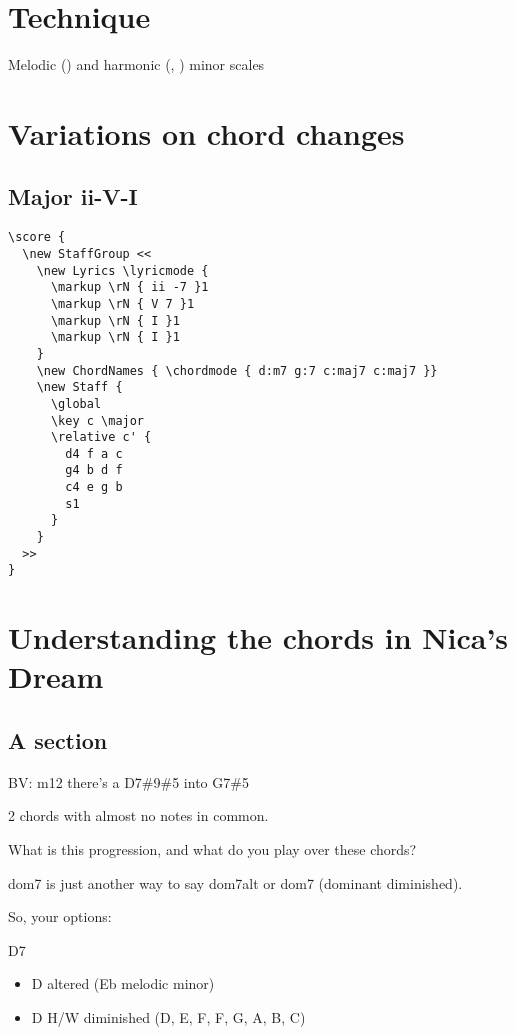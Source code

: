 \documentclass[11pt]{article}
\begin{document}
\section{Technique}
\label{sec:org7b39137}
Melodic () and harmonic (, ) minor scales
\section{Variations on chord changes}
\label{sec:orgda233fb}

\subsection{Major ii-V-I}
\label{sec:orgcec6f3b}
\begin{verbatim}
\score {
  \new StaffGroup <<
    \new Lyrics \lyricmode {
      \markup \rN { ii -7 }1
      \markup \rN { V 7 }1
      \markup \rN { I }1
      \markup \rN { I }1
    }
    \new ChordNames { \chordmode { d:m7 g:7 c:maj7 c:maj7 }}
    \new Staff {
      \global
      \key c \major
      \relative c' {
        d4 f a c
        g4 b d f
        c4 e g b
        s1
      }
    }
  >>
}
\end{verbatim}

\section{Understanding the chords in Nica’s Dream}
\label{sec:org58fb08d}

\subsection{A section}
\label{sec:org98b1f4a}

BV: m12 there’s a D7\#9\#5 into G7\#5

2 chords with almost no notes in common.

What is this progression, and what do you play over these chords?


dom7 is just another way to say dom7alt or dom7 (dominant diminished).

So, your options:

D7
\begin{itemize}
\item D altered (Eb melodic minor)
\item D H/W diminished (D, E\flat,  F, F\sharp,  G\sharp,  A, B, C)
\end{itemize}
\end{document}

